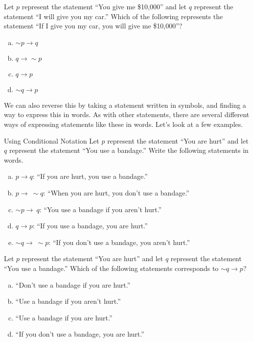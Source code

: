 \begin{try}
Let $p$ represent the statement ``You give me \$10,000'' and let $q$ represent the statement ``I will give you my car.''  Which of the following  represents the statement ``If I give you my car, you will give me \$10,000''?
\begin{enumerate}[(a)]
\item $\sim p \to q$
\item $q \to \sim p$
\item $q \to p$
\item $\sim q \to p$
\end{enumerate}
\end{try}

We can also reverse this by taking a statement written in symbols, and finding a way to express this in words.  As with other statements, there are several different ways of expressing statements like these in words.  Let's look at a few examples.

\begin{example}[https://www.youtube.com/watch?v=loZvvBM3BZk]{Using Conditional Notation}
Let $p$ represent the statement ``You are hurt'' and let $q$ represent the statement ``You use a bandage.''  Write the following statements in words.
\begin{enumerate}[(a)]
\item $p \to q$: ``If you are hurt, you use a bandage.''
\item $p \to\ \sim q$: ``When you are hurt, you don't use a bandage.''
\item $\sim p \to\ q$: ``You use a bandage if you aren't hurt.''
\item $q \to p$: ``If you use a bandage, you are hurt.''
\item $\sim q \to\ \sim p$: ``If you don't use a bandage, you aren't hurt.''
\end{enumerate}
\end{example}

\begin{try}
Let $p$ represent the statement ``You are hurt'' and let $q$ represent the statement ``You use a bandage.''  Which of the following statements corresponds to $\sim q \to p$?
\begin{enumerate}[(a)]
\item ``Don't use a bandage if you are hurt.''
\item ``Use a bandage if you aren't hurt.''
\item ``Use a bandage if you are hurt.''
\item ``If you don't use a bandage, you are hurt.''
\end{enumerate}
\end{try}

